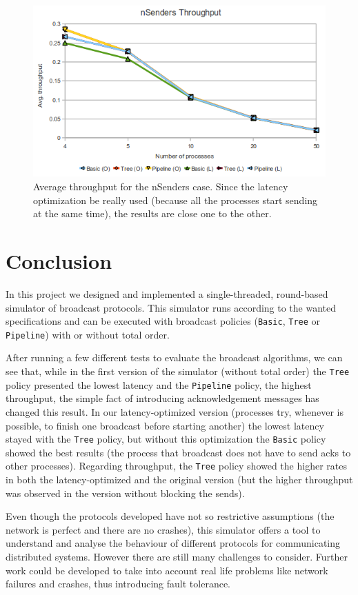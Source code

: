 \documentclass[a4paper, 11pt]{article}
\begin{document}
\begin{figure}[htp]
  \centering
  \includegraphics[scale=0.6]{avgTpNSenders.png}
	\caption{Average throughput for the nSenders case. Since the latency optimization be really used (because all the processes start sending at the same time), the results are close one to the other.}
  \label{fig:avgTpNSenders}
\end{figure}

\newpage
\section{Conclusion}
	In this project we designed and implemented a single-threaded, round-based simulator of broadcast protocols. This simulator runs according to the wanted specifications and can be executed with broadcast policies (\texttt{Basic}, \texttt{Tree} or \texttt{Pipeline}) with or without total order. 
	
	After running a few different tests to evaluate the broadcast algorithms, we can see that, while in the first version of the simulator (without total order) the \texttt{Tree} policy presented the lowest latency and the \texttt{Pipeline} policy, the highest throughput, the simple fact of introducing acknowledgement messages has changed this result. In our latency-optimized version (processes try, whenever is possible, to finish one broadcast before starting another) the lowest latency stayed with the \texttt{Tree} policy, but without this optimization the \texttt{Basic} policy showed the best results (the process that broadcast does not have to send acks to other processes). Regarding throughput, the \texttt{Tree} policy showed the higher rates in both the latency-optimized and the original version (but the higher throughput was observed in the version without blocking the sends).
	
	Even though the protocols developed have not so restrictive assumptions (the network is perfect and there are no crashes), this simulator offers a tool to understand and analyse the behaviour of different protocols for communicating distributed systems. However there are still many challenges to consider. Further work could be developed to take into account real life problems like network failures and crashes, thus introducing fault tolerance. 
 
\end{document}
